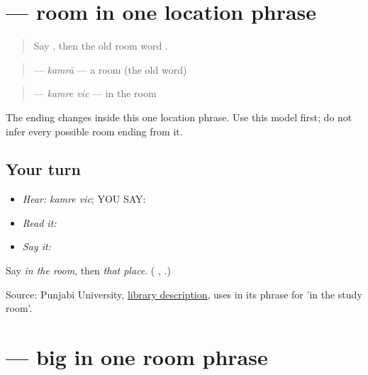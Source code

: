 \section[\texorpdfstring{\pa{ਕਮਰੇ} (kamre)}{ਕਮਰੇ (kamre)}]{ — room in one location phrase}

\label{lesson:PA-C180-kamre}



\begin{quote}
Say \textbf{ }, then the old room word \textbf{}.
\end{quote}

\begin{grammarlens}[title={Grammar Lens: one room phrase}]
\begin{quote}
\textbf{} — \emph{kamrā} — a room (the old word)
\end{quote}

\begin{quote}
\textbf{ } — \emph{kamre vic} — in the room
\end{quote}

The ending changes inside this one location phrase. Use this model first; do not infer every possible room ending from it.
\end{grammarlens}

\subsection*{Your turn}
\begin{itemize}
\raggedright
  \item \emph{Hear:} \emph{kamre vic}; YOU SAY: \textbf{ }
  \item \emph{Read it:} \textbf{ }
  \item \emph{Say it:} \textbf{ }
\end{itemize}

\begin{tcolorbox}[breakable,colback=teal!4,colframe=teal!35!black,title={Before you move on}]
Say \emph{in the room}, then \emph{that place}. (\textbf{ }, \textbf{ }.)

Source: Punjabi University, \href{https://punjabiuniversity.ac.in/Pages/Department.aspx?dsenc=129}{library description}, uses \textbf{ } in its phrase for 'in the study room'.
\end{tcolorbox}
\section[\texorpdfstring{\pa{ਵੱਡੇ} (vadde)}{ਵੱਡੇ (vadde)}]{ — big in one room phrase}

